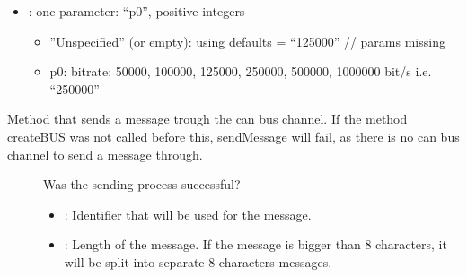 \documentclass[letterpaper,10pt,english]{sphinxmanual}
\begin{document}
\begin{fulllineitems}
\begin{fulllineitems}
\begin{description}
\begin{itemize}
\begin{itemize}
\end{itemize}


\item {} 
: one parameter: “p0”, positive integers\begin{itemize}
\item {} 
”Unspecified” (or empty): using defaults = “125000” // params missing

\item {} 
p0: bitrate: 50000, 100000, 125000, 250000, 500000, 1000000 bit/s i.e. “250000”

\end{itemize}


\end{itemize}

\end{description}


\end{fulllineitems}


\begin{fulllineitems}
\label{\detokenize{vendors/systec:_CPPv4N9STCanScan11sendMessageEshPhb}}%
\pysigstartmultiline
{}\label{\detokenize{vendors/systec:classSTCanScan_1a45f0ec011022bf58a23e8370bac7f829}}%
\pysigstopmultiline
Method that sends a message trough the can bus channel. If the method createBUS was not called before this, sendMessage will fail, as there is no can bus channel to send a message through.

\begin{description}
\item[{}] \leavevmode
Was the sending process successful? 

\item[{}] \leavevmode\begin{itemize}
\item {} 
: Identifier that will be used for the message. 

\item {} 
: Length of the message. If the message is bigger than 8 characters, it will be split into separate 8 characters messages. 


\end{itemize}
\end{description}
\end{fulllineitems}
\end{fulllineitems}
\end{document}
